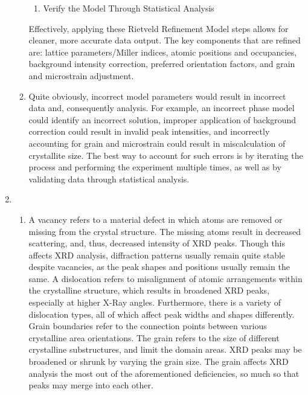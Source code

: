 \begin{enumerate}
\begin{enumerate}
\begin{enumerate}
          \item Verify the Model Through Statistical Analysis

        \end{enumerate}

        Effectively, applying these Rietveld Refinement Model steps allows for cleaner, more accurate data output. The key components that are refined are: lattice parameters/Miller indices, atomic positions and occupancies, background intensity correction, preferred orientation factors, and grain and microstrain adjustment.

      \item Quite obviously, incorrect model parameters would result in incorrect data and, consequently analysis. For example, an incorrect phase model could identify an incorrect solution, improper application of background correction could result in invalid peak intensities, and incorrectly accounting for grain and microstrain could result in miscalculation of crystallite size. The best way to account for such errors is by iterating the process and performing the experiment multiple times, as well as by validating data through statistical analysis.

    \end{enumerate}

  \item

    \begin{enumerate}

      \item A vacancy refers to a material defect in which atoms are removed or missing from the crystal structure. The missing atoms result in decreased scattering, and, thus, decreased intensity of XRD peaks. Though this affects XRD analysis, diffraction patterns usually remain quite stable despite vacancies, as the peak shapes and positions usually remain the same. A dislocation refers to misalignment of atomic arrangements within the crystalline structure, which results in broadened XRD peaks, especially at higher X-Ray angles. Furthermore, there is a variety of dislocation types, all of which affect peak widths and shapes differently. Grain boundaries refer to the connection points between various crystalline area orientations. The grain refers to the size of different crystalline substructures, and limit the domain areas. XRD peaks may be broadened or shrunk by varying the grain size. The grain affects XRD analysis the most out of the aforementioned deficiencies, so much so that peaks may merge into each other.


\end{enumerate}
\end{enumerate}
